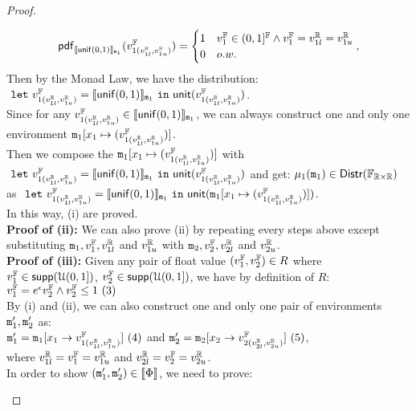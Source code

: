 \documentclass[a4paper,11pt]{article}
\begin{document}
\begin{proof}
\begin{itemize}
\begin{subproof}
	\[
	\mathsf{pdf}_{\llbracket \mathsf{unif}(0, 1) \rrbracket_{\mathtt{m}_1}}(v^{\mathbb{F}}_{1(v^{\mathbb{R}}_{1l}, v^{\mathbb{R}}_{1u})}) = 
		\begin{cases}
		1 & v^{\mathbb{F}}_1 \in (0,1]^{\mathbb{F}}
		\land  v^{\mathbb{F}}_1 = v^{\mathbb{R}}_{1l} = v^{\mathbb{R}}_{1u}
		\\
		0       & o.w.
		\end{cases},
	\]
	Then by the Monad Law, we have the distribution:
	$~\mathtt{let}~ v^{\mathbb{F}}_{1(v^{\mathbb{R}}_{1l}, v^{\mathbb{R}}_{1u})} = \llbracket \mathsf{unif}(0, 1) \rrbracket_{\mathtt{m}_1} 
	~\mathtt{in}~ \mathsf{unit}(v^{\mathbb{F}}_{1(v^{\mathbb{R}}_{1l}, v^{\mathbb{R}}_{1u})})$.
	\\
	Since for any $v^{\mathbb{F}}_{1(v^{\mathbb{R}}_{1l}, v^{\mathbb{R}}_{1u})} \in \llbracket \mathsf{unif}(0, 1) \rrbracket_{\mathtt{m}_1}$, 
	we can always construct one and only one environment $\mathtt{m}_1[x_1 \mapsto (v^{\mathbb{F}}_{1(v^{\mathbb{R}}_{1l}, v^{\mathbb{R}}_{1u})})]$.
	\\
	Then we compose the  
	$\mathtt{m}_1[x_1 \mapsto (v^{\mathbb{F}}_{1(v^{\mathbb{R}}_{1l}, v^{\mathbb{R}}_{1u})})]$
	with $~\mathtt{let}~ v^{\mathbb{F}}_{1(v^{\mathbb{R}}_{1l}, v^{\mathbb{R}}_{1u})} = \llbracket \mathsf{unif}(0, 1) \rrbracket_{\mathtt{m}_1} 
	~\mathtt{in}~ \mathsf{unit}(v^{\mathbb{F}}_{1(v^{\mathbb{R}}_{1l}, v^{\mathbb{R}}_{1u})})$ and get:
	$\mu_1(\mathtt{m}_1) \in \mathsf{Distr}(\mathbb{F}_{\mathbb{R} \times \mathbb{R}})$ as 
	$~\mathtt{let}~ v^{\mathbb{F}}_{1(v^{\mathbb{R}}_{1l}, v^{\mathbb{R}}_{1u})} = \llbracket \mathsf{unif}(0, 1) \rrbracket_{\mathtt{m}_1} 
	~\mathtt{in}~ \mathsf{unit}(\mathtt{m}_1[x_1 \mapsto (v^{\mathbb{F}}_{1(v^{\mathbb{R}}_{1l}, v^{\mathbb{R}}_{1u})})])$.
	\\
	In this way, (i) are proved.
	\\
	\textbf{Proof of (ii):} 
	We can also prove (ii) by repeating every steps above except substituting $\mathtt{m}_1, v^{\mathbb{F}}_1, v^{\mathbb{R}}_{1l}$ and $v^{\mathbb{R}}_{1u}$ with $\mathtt{m}_2, v^{\mathbb{F}}_2, v^{\mathbb{R}}_{2l}$ and $v^{\mathbb{R}}_{2u}$.
	\\
	\textbf{Proof of (iii):} 
	Given any pair of float value $(v^{\mathbb{F}}_1, v^{\mathbb{F}}_2) \in R$ where 
	$v^{\mathbb{F}}_1 \in \mathsf{supp}(\mathcal{U}(0,1])$, 
	$v^{\mathbb{F}}_2 \in \mathsf{supp}(\mathcal{U}(0,1])$, we have by definition of $R$:
	$v^{\mathbb{F}}_1  = e^{\epsilon}  v^{\mathbb{F}}_2 
		\land v^{\mathbb{F}}_2 \leq 1
	 ~ (3)$
	\\
	By (i) and (ii), we can also construct one and only one pair of environments $\mathtt{m}_1', \mathtt{m}_2'$ as:
	\\
	$\mathtt{m}_1' = \mathtt{m}_1[x_1 \to v^{\mathbb{F}}_{1(v^{\mathbb{R}}_{1l}, v^{\mathbb{R}}_{1u})}] ~ (4)$ and
	$\mathtt{m}_2' = \mathtt{m}_2[x_2 \to v^{\mathbb{F}}_{2(v^{\mathbb{R}}_{2l}, v^{\mathbb{R}}_{2u})}] ~ (5)$,
	\\
	where $v^{\mathbb{R}}_{1l} = v^{\mathbb{F}}_1 = v^{\mathbb{R}}_{1u}$ and $v^{\mathbb{R}}_{2l} = v^{\mathbb{F}}_2 = v^{\mathbb{R}}_{2u}$.
	\\
	In order to show $(\mathtt{m}_1', \mathtt{m}_2') \in \llbracket \Phi \rrbracket$, we need to prove:
	\\

\end{subproof}
\end{itemize}
\end{proof}
\end{document}
